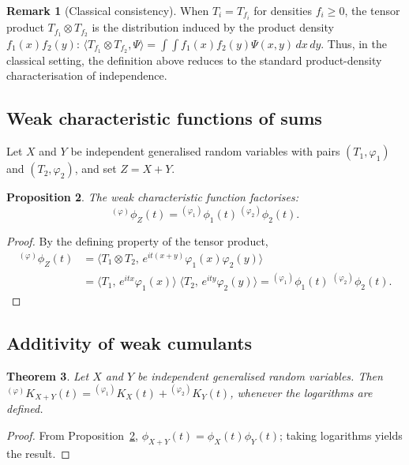 \documentclass[12pt]{article}
\newtheorem{theorem}{Theorem}[section]
\newtheorem{proposition}[theorem]{Proposition}
\theoremstyle{definition}
\newtheorem{remark}[theorem]{Remark}
\begin{document}
\begin{remark}[Classical consistency]\label{rem:independence-classical}
When $T_i = T_{f_i}$ for densities $f_i\ge 0$, the tensor product
$T_{f_1}\otimes T_{f_2}$ is the distribution induced by the product
density $f_1(x)f_2(y)$:
$\langle T_{f_1}\otimes T_{f_2},\Psi\rangle
= \int\!\int f_1(x)f_2(y)\Psi(x,y)\,dx\,dy$.
Thus, in the classical setting, the definition above reduces to the
standard product-density characterisation of independence.
\end{remark}

\subsection{Weak characteristic functions of sums}
\label{subsec:independence_cf}

Let $X$ and $Y$ be independent generalised random variables with pairs $(T_1,\varphi_1)$ and $(T_2,\varphi_2)$, and set $Z=X+Y$.

\begin{proposition}\label{prop:cf-factorise}
The weak characteristic function factorises:
\[
{}^{(\varphi)}\phi_Z(t) = {}^{(\varphi_1)}\phi_1(t)\,{}^{(\varphi_2)}\phi_2(t).
\]
\end{proposition}

\begin{proof}
By the defining property of the tensor product,
\begin{align*}
{}^{(\varphi)}\phi_Z(t)
&= \langle T_1 \otimes T_2,\,
e^{it(x+y)}\varphi_1(x)\varphi_2(y)\rangle \\
&= \langle T_1,\,e^{itx}\varphi_1(x)\rangle\;
\langle T_2,\,e^{ity}\varphi_2(y)\rangle
= {}^{(\varphi_1)}\phi_1(t)\;{}^{(\varphi_2)}\phi_2(t).
\end{align*}
\end{proof}

\subsection{Additivity of weak cumulants}
\label{subsec:independence_cumulants}

\begin{theorem}\label{thm:cumulant-additivity}
Let $X$ and $Y$ be independent generalised random variables.  Then ${}^{(\varphi)}K_{X+Y}(t) = {}^{(\varphi_1)}K_X(t) + {}^{(\varphi_2)}K_Y(t)$, whenever the logarithms are defined.
\end{theorem}

\begin{proof}
From Proposition~\ref{prop:cf-factorise}, $\phi_{X+Y}(t)=\phi_X(t)\phi_Y(t)$; taking logarithms yields the result.
\end{proof}
\end{document}
